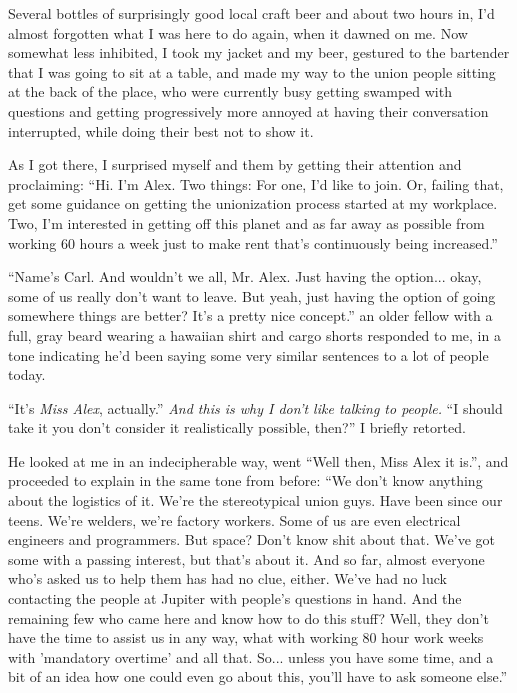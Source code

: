 \documentclass[a5paper]{report}%
\newcommand\spacer{{\center{$\cdots\\$}}}
\begin{document}
\spacer

Several bottles of surprisingly good local craft beer and about two hours in,
I'd almost forgotten what I was here to do again, when it dawned on me. Now
somewhat less inhibited, I took my jacket and my beer, gestured to the bartender
that I was going to sit at a table, and made my way to the union people sitting
at the back of the place, who were currently busy getting swamped with questions
and getting progressively more annoyed at having their conversation interrupted,
while doing their best not to show it.

As I got there, I surprised myself and them by getting their attention and
proclaiming: ``Hi. I'm Alex. Two things: For one, I'd like to join. Or, failing
that, get some guidance on getting the unionization process started at my
workplace. Two, I'm interested in getting off this planet and as far away as
possible from working 60 hours a week just to make rent that's continuously
being increased.''

``Name's Carl. And wouldn't we all, Mr. Alex. Just having the option... okay,
some of us really don't want to leave. But yeah, just having the option of going
somewhere things are better? It's a pretty nice concept.'' an older fellow with
a full, gray beard wearing a hawaiian shirt and cargo shorts responded to me, in
a tone indicating he'd been saying some very similar sentences to a lot of
people today.

``It's \textit{Miss Alex}, actually.'' \textit{And this is why I don't like
  talking to people.} ``I should take it you don't consider it realistically
possible, then?'' I briefly retorted.

He looked at me in an indecipherable way, went ``Well then, Miss Alex it is.'',
and proceeded to explain in the same tone from before: ``We
don't know anything about the logistics of it. We're the stereotypical union
guys. Have been since our teens. We're welders, we're factory workers. Some of
us are even electrical engineers and programmers. But space? Don't know shit
about that. We've got some with a passing interest, but that's about it. And so
far, almost everyone who's asked us to help them has had no clue, either. We've
had no luck contacting the people at Jupiter with people's questions in hand.
And the remaining few who came here and know how to do this stuff? Well, they
don't have the time to assist us in any way, what with working 80 hour work
weeks with 'mandatory overtime' and all that. So... unless you have some time,
and a bit of an idea how one could even go about this, you'll have to ask
someone else.''
\end{document}
